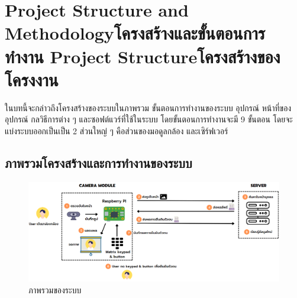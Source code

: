 \chapter{\ifproject%
\ifenglish Project Structure and Methodology\else โครงสร้างและขั้นตอนการทำงาน\fi
\else%
\ifenglish Project Structure\else โครงสร้างของโครงงาน\fi
\fi
}

ในบทนี้จะกล่าวถึงโครงสร้างของระบบในภาพรวม ขั้นตอนการทํางานของระบบ อุปกรณ์ หน้าที่ของอุปกรณ์ กลวิธีการต่าง ๆ และซอฟต์แวร์ที่ใช้ในระบบ โดยขั้นตอนการทํางานจะมี 9 ขั้นตอน
โดยจะแบ่งระบบออกเป็นเป็น 2 ส่วนใหญ่ ๆ คือส่วนของมอดูลกล้อง และเซิร์ฟเวอร์

\makeatletter


\makeatother



\section{ภาพรวมโครงสร้างและการทำงานของระบบ}


\begin{figure}[ht!]
  \begin{center}
    \includegraphics[scale=.5]{pic/overview.png}
  \caption[ภาพรวมของระบบ]{ภาพรวมของระบบ}
  \end{center}
  \label{fig:overview}
\end{figure}

